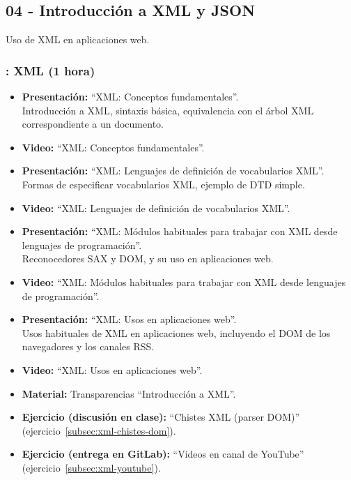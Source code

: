 \documentclass[a4paper,12pt]{article}
\begin{document}
\subsection{04 - Introducción a XML y JSON}

Uso de XML en aplicaciones web.

\subsubsection{\juevesI: XML (1 hora)}

\begin{itemize}
\item \textbf{Presentación:} ``XML: Conceptos fundamentales''. \\
  Introducción a XML, sintaxis básica, equivalencia con el árbol XML correspondiente a un documento.
\item \textbf{Video:} ``XML: Conceptos fundamentales''.

\item \textbf{Presentación:} ``XML: Lenguajes de definición de vocabularios XML''. \\
  Formas de especificar vocabularios XML, ejemplo de DTD simple.
\item \textbf{Video:} ``XML: Lenguajes de definición de vocabularios XML''.
\item \textbf{Presentación:} ``XML: Módulos habituales para trabajar con XML desde lenguajes de programación''. \\
  Reconocedores SAX y DOM, y su uso en aplicaciones web.
\item \textbf{Video:} ``XML: Módulos habituales para trabajar con XML desde lenguajes de programación''.
\item \textbf{Presentación:} ``XML: Usos en aplicaciones web''. \\
  Usos habituales de XML en aplicaciones web, incluyendo el DOM de los navegadores y los canales RSS.
\item \textbf{Video:} ``XML: Usos en aplicaciones web''.
\item \textbf{Material:} Transparencias ``Introducción a XML''.
\item \textbf{Ejercicio (discusión en clase):} ``Chistes XML (parser DOM)'' (ejercicio~\ref{subsec:xml-chistes-dom}).
\item \textbf{Ejercicio (entrega en GitLab):} ``Videos en canal de YouTube'' (ejercicio~\ref{subsec:xml-youtube}).
\end{itemize}
\end{document}
